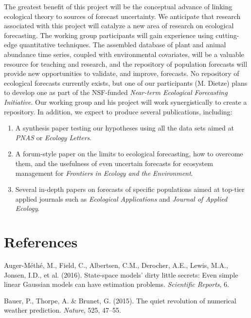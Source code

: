 \documentclass[12pt,]{article}
\providecommand{\tightlist}{%
  \setlength{\itemsep}{0pt}\setlength{\parskip}{0pt}}
\begin{document}
The greatest benefit of this project will be the conceptual advance of
linking ecological theory to sources of forecast uncertainty. We
anticipate that research associated with this project will catalyze a
new area of research on ecological forecasting. The working group
participants will gain experience using cutting-edge quantitative
techniques. The assembled database of plant and animal abundance time
series, coupled with environmental covariates, will be a valuable
resource for teaching and research, and the repository of population
forecasts will provide new opportunities to validate, and improve,
forecasts. No repository of ecological forecasts currently exists, but
one of our participants (M. Dietze) plans to develop one as part of the
NSF-funded \emph{Near-term Ecological Forecasting Initiative}. Our
working group and his project will work synergistically to create a
repository. In addition, we expect to produce several publications,
including:

\begin{enumerate}
\def\labelenumi{\arabic{enumi}.}
\tightlist
\item
  A synthesis paper testing our hypotheses using all the data sets aimed
  at \emph{PNAS} or \emph{Ecology Letters}.
\item
  A forum-style paper on the limits to ecological forecasting, how to
  overcome them, and the usefulness of even uncertain forecasts for
  ecosystem management for \emph{Frontiers in Ecology and the
  Environment}.
\item
  Several in-depth papers on forecasts of specific populations aimed at
  top-tier applied journals such as \emph{Ecological Applications} and
  \emph{Journal of Applied Ecology}.
\end{enumerate}

\section*{References}\label{references}

\hypertarget{refs}{}
\hypertarget{ref-Auger-Methe2016}{}
Auger-Méthé, M., Field, C., Albertsen, C.M., Derocher, A.E., Lewis,
M.A., Jonsen, I.D., et al. (2016). State-space models' dirty little
secrets: Even simple linear Gaussian models can have estimation
problems. \emph{Scientific Reports}, 6.

\hypertarget{ref-Bauer2015}{}
Bauer, P., Thorpe, A. \& Brunet, G. (2015). The quiet revolution of
numerical weather prediction. \emph{Nature}, 525, 47--55.
\end{document}
